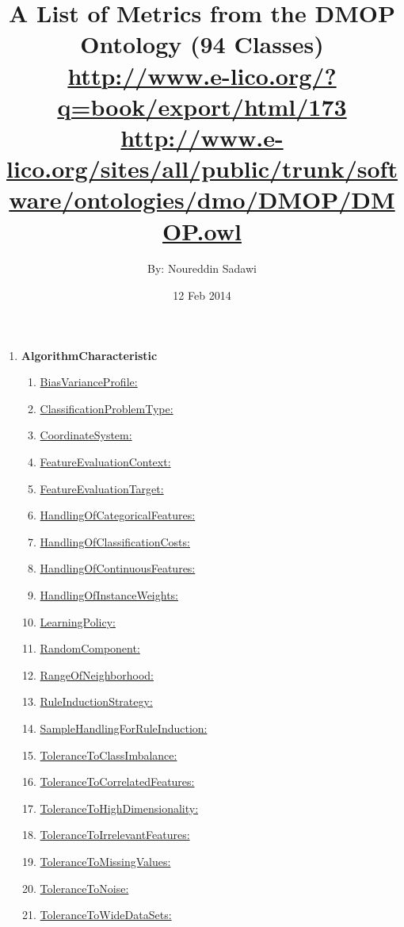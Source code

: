 \documentclass[a4paper,12pt, english]{article}
\begin{document}
\title{A List of Metrics from the DMOP Ontology (94 Classes)\\ \small{\url{http://www.e-lico.org/?q=book/export/html/173}} \\ \small{\url{http://www.e-lico.org/sites/all/public/trunk/software/ontologies/dmo/DMOP/DMOP.owl}}}
\date{12 Feb 2014}
\author{By: Noureddin Sadawi}
\maketitle

\large

\begin{enumerate}

\item \textbf{AlgorithmCharacteristic}
	\begin{enumerate}
	\item \underline{BiasVarianceProfile:}
	\item \underline{ClassificationProblemType:}
	\item \underline{CoordinateSystem:}
	\item \underline{FeatureEvaluationContext:}
	\item \underline{FeatureEvaluationTarget:}
	\item \underline{HandlingOfCategoricalFeatures:}
	\item \underline{HandlingOfClassificationCosts:}
	\item \underline{HandlingOfContinuousFeatures:}
	\item \underline{HandlingOfInstanceWeights:}
	\item \underline{LearningPolicy:}
	\item \underline{RandomComponent:}
	\item \underline{RangeOfNeighborhood:}
	\item \underline{RuleInductionStrategy:}
	\item \underline{SampleHandlingForRuleInduction:}
	\item \underline{ToleranceToClassImbalance:}
	\item \underline{ToleranceToCorrelatedFeatures:}
	\item \underline{ToleranceToHighDimensionality:}
	\item \underline{ToleranceToIrrelevantFeatures:}
	\item \underline{ToleranceToMissingValues:}
	\item \underline{ToleranceToNoise:}
	\item \underline{ToleranceToWideDataSets:}

\end{enumerate}
\end{enumerate}
\end{document}
